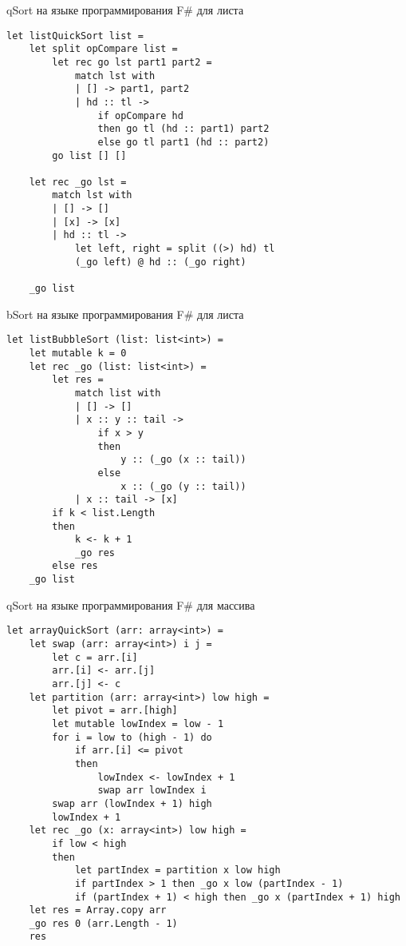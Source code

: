 \begin{algorithm}[H]
\caption{qSort на языке программирования F\# для листа}
\label{lst:qSortList}
\begin{verbatim}
let listQuickSort list =
    let split opCompare list =
        let rec go lst part1 part2 =
            match lst with
            | [] -> part1, part2
            | hd :: tl ->
                if opCompare hd
                then go tl (hd :: part1) part2
                else go tl part1 (hd :: part2)
        go list [] []

    let rec _go lst =
        match lst with
        | [] -> []
        | [x] -> [x]
        | hd :: tl ->
            let left, right = split ((>) hd) tl
            (_go left) @ hd :: (_go right)

    _go list
\end{verbatim}
\end{algorithm}
\begin{algorithm}[H]
\caption{bSort на языке программирования F\# для листа}
\label{lst:bSortList}
\begin{verbatim}
let listBubbleSort (list: list<int>) =
    let mutable k = 0
    let rec _go (list: list<int>) =
        let res =
            match list with
            | [] -> []
            | x :: y :: tail ->
                if x > y
                then
                    y :: (_go (x :: tail))
                else
                    x :: (_go (y :: tail))
            | x :: tail -> [x]
        if k < list.Length
        then
            k <- k + 1
            _go res
        else res
    _go list
\end{verbatim}
\end{algorithm}
\begin{algorithm}[H]
\caption{qSort на языке программирования F\# для массива}
\label{lst:qSortArray}
\begin{verbatim}
let arrayQuickSort (arr: array<int>) =
    let swap (arr: array<int>) i j =
        let c = arr.[i]
        arr.[i] <- arr.[j]
        arr.[j] <- c
    let partition (arr: array<int>) low high =
        let pivot = arr.[high]
        let mutable lowIndex = low - 1
        for i = low to (high - 1) do
            if arr.[i] <= pivot
            then
                lowIndex <- lowIndex + 1
                swap arr lowIndex i
        swap arr (lowIndex + 1) high
        lowIndex + 1
    let rec _go (x: array<int>) low high =
        if low < high
        then
            let partIndex = partition x low high
            if partIndex > 1 then _go x low (partIndex - 1)
            if (partIndex + 1) < high then _go x (partIndex + 1) high
    let res = Array.copy arr
    _go res 0 (arr.Length - 1)
    res
\end{verbatim}
\end{algorithm}
